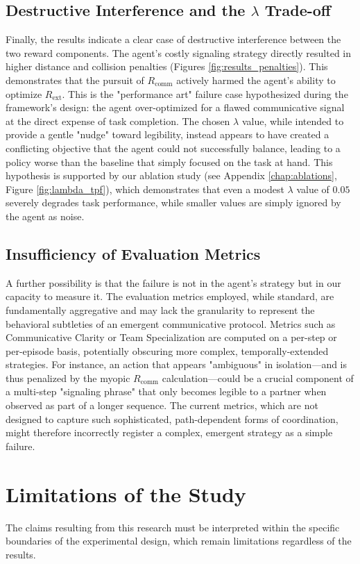 \documentclass[12pt, a4paper]{report}
\newcommand{\Rcomm}{R_{\text{comm}}}
\newcommand{\Rext}{R_{\text{ext}}}
\begin{document}
\subsection{Destructive Interference and the $\lambda$ Trade-off}
Finally, the results indicate a clear case of destructive interference between the two reward components. The agent's costly signaling strategy directly resulted in higher distance and collision penalties (Figures \ref{fig:results_penalties}). This demonstrates that the pursuit of $\Rcomm$ actively harmed the agent's ability to optimize $\Rext$. This is the "performance art" failure case hypothesized during the framework's design: the agent over-optimized for a flawed communicative signal at the direct expense of task completion. The chosen $\lambda$ value, while intended to provide a gentle "nudge" toward legibility, instead appears to have created a conflicting objective that the agent could not successfully balance, leading to a policy worse than the baseline that simply focused on the task at hand. This hypothesis is supported by our ablation study (see Appendix \ref{chap:ablations}, Figure \ref{fig:lambda_tpf}), which demonstrates that even a modest $\lambda$ value of $0.05$ severely degrades task performance, while smaller values are simply ignored by the agent as noise.

\subsection{Insufficiency of Evaluation Metrics}
A further possibility is that the failure is not in the agent's strategy but in our capacity to measure it. The evaluation metrics employed, while standard, are fundamentally aggregative and may lack the granularity to represent the behavioral subtleties of an emergent communicative protocol. Metrics such as Communicative Clarity or Team Specialization are computed on a per-step or per-episode basis, potentially obscuring more complex, temporally-extended strategies. For instance, an action that appears "ambiguous" in isolation---and is thus penalized by the myopic $\Rcomm$ calculation---could be a crucial component of a multi-step "signaling phrase" that only becomes legible to a partner when observed as part of a longer sequence. The current metrics, which are not designed to capture such sophisticated, path-dependent forms of coordination, might therefore incorrectly register a complex, emergent strategy as a simple failure.

\section{Limitations of the Study}
The claims resulting from this research must be interpreted within the specific boundaries of the experimental design, which remain limitations regardless of the results.
\end{document}
